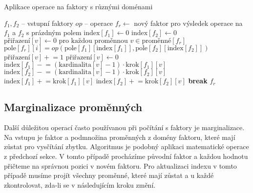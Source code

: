 \begin{algorithm}
\caption{Aplikace operace na faktory s různými doménami}
\label{alg:apop}
\begin{algorithmic}
\State $f_1, f_2$ -- vstupní faktory
\State $op$ -- operace
\State
\State $f_r \gets$ nový faktor pro výsledek operace na $f_1$ a $f_2$ s prázdným polem
\State
\State $\text{index}[f_1] \gets 0$
\State $\text{index}[f_2] \gets 0$
\State $\text{přiřazení}[v] \gets 0 \text{ pro každou proměnnou } v \in \text{proměnné}[f_r]$
\State
{}
	\State $\text{pole}[f_r][i] = op(\text{pole}[f_1][\text{index}[f_1]], \text{pole}[f_2][\text{index}[f_2]])$
		\State $\text{přiřazení}[v] \mathrel{+}= 1$
			\State $\text{přiřazení}[v] \gets 0$
			\State $\text{index}[f_1] \mathrel{-}= (\text{kardinalita}[v] - 1) \cdot \text{krok}[f_1][v]$
			\State $\text{index}[f_2] \mathrel{-}= (\text{kardinalita}[v] - 1) \cdot \text{krok}[f_2][v]$
		\Else
			\State $\text{index}[f_1] \mathrel{+}= \text{krok}[f_1][v]$
			\State $\text{index}[f_2] \mathrel{+}= \text{krok}[f_2][v]$
			\State \textbf{break}
		\EndIf
	\EndFor
\EndFor
\State \Return $f_r$
\EndFunction
\end{algorithmic}
\end{algorithm}

\subsection{Marginalizace proměnných}

Další důležitou operací často používanou při počítání s faktory je marginalizace.
Na vstupu je faktor a podmnožina proměnných z domény faktoru, které mají zůstat pro vysčítání zbytku.
Algoritmus je podobný aplikaci matematické operace z předchozí sekce.
V tomto případě procházíme původní faktor a každou hodnotu přičteme na správnou pozici v novém faktoru.
Pro aktualizaci indexu v tomto případě musíme projít všechny proměnné, které mají zůstat a u každé zkontrolovat, zda-li se v následujícím kroku změní.

